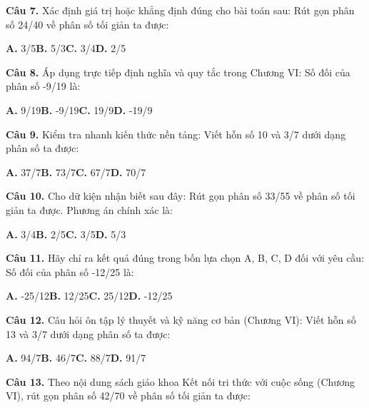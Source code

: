 \documentclass[11pt,a4paper]{article}
\begin{document}
\textbf{\color{primary} Câu 7.} Xác định giá trị hoặc khẳng định đúng cho bài toán sau: Rút gọn phân số 24/40 về phân số tối giản ta được:\par
\hspace*{1.5em}\textbf{A.} 3/5\quad\quad \textbf{B.} 5/3\quad\quad \textbf{C.} 3/4\quad\quad \textbf{D.} 2/5\par\vspace{2pt}
\textbf{\color{primary} Câu 8.} Áp dụng trực tiếp định nghĩa và quy tắc trong Chương VI: Số đối của phân số -9/19 là:\par
\hspace*{1.5em}\textbf{A.} 9/19\quad\quad \textbf{B.} -9/19\quad\quad \textbf{C.} 19/9\quad\quad \textbf{D.} -19/9\par\vspace{2pt}
\textbf{\color{primary} Câu 9.} Kiểm tra nhanh kiến thức nền tảng: Viết hỗn số 10 và 3/7 dưới dạng phân số ta được:\par
\hspace*{1.5em}\textbf{A.} 37/7\quad\quad \textbf{B.} 73/7\quad\quad \textbf{C.} 67/7\quad\quad \textbf{D.} 70/7\par\vspace{2pt}
\textbf{\color{primary} Câu 10.} Cho dữ kiện nhận biết sau đây: Rút gọn phân số 33/55 về phân số tối giản ta được. Phương án chính xác là:\par
\hspace*{1.5em}\textbf{A.} 3/4\quad\quad \textbf{B.} 2/5\quad\quad \textbf{C.} 3/5\quad\quad \textbf{D.} 5/3\par\vspace{2pt}
\textbf{\color{primary} Câu 11.} Hãy chỉ ra kết quả đúng trong bốn lựa chọn A, B, C, D đối với yêu cầu: Số đối của phân số -12/25 là:\par
\hspace*{1.5em}\textbf{A.} -25/12\quad\quad \textbf{B.} 12/25\quad\quad \textbf{C.} 25/12\quad\quad \textbf{D.} -12/25\par\vspace{2pt}
\textbf{\color{primary} Câu 12.} Câu hỏi ôn tập lý thuyết và kỹ năng cơ bản (Chương VI): Viết hỗn số 13 và 3/7 dưới dạng phân số ta được:\par
\hspace*{1.5em}\textbf{A.} 94/7\quad\quad \textbf{B.} 46/7\quad\quad \textbf{C.} 88/7\quad\quad \textbf{D.} 91/7\par\vspace{2pt}
\textbf{\color{primary} Câu 13.} Theo nội dung sách giáo khoa Kết nối tri thức với cuộc sống (Chương VI), rút gọn phân số 42/70 về phân số tối giản ta được:\par
\end{document}
